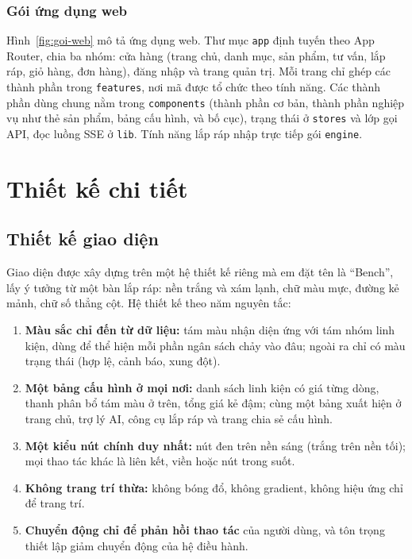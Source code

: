 \subsubsection{Gói ứng dụng web}


Hình~\ref{fig:goi-web} mô tả ứng dụng web. Thư mục \texttt{app} định tuyến theo App Router, chia ba nhóm: cửa hàng (trang chủ, danh mục, sản phẩm, tư vấn, lắp ráp, giỏ hàng, đơn hàng), đăng nhập và trang quản trị. Mỗi trang chỉ ghép các thành phần trong \texttt{features}, nơi mã được tổ chức theo tính năng. Các thành phần dùng chung nằm trong \texttt{components} (thành phần cơ bản, thành phần nghiệp vụ như thẻ sản phẩm, bảng cấu hình, và bố cục), trạng thái ở \texttt{stores} và lớp gọi API, đọc luồng SSE ở \texttt{lib}. Tính năng lắp ráp nhập trực tiếp gói \texttt{engine}.

\section{Thiết kế chi tiết}

\subsection{Thiết kế giao diện}

Giao diện được xây dựng trên một hệ thiết kế riêng mà em đặt tên là ``Bench'', lấy ý tưởng từ một bàn lắp ráp: nền trắng và xám lạnh, chữ màu mực, đường kẻ mảnh, chữ số thẳng cột. Hệ thiết kế theo năm nguyên tắc:
\begin{enumerate}[label=(\roman*)]
  \item \textbf{Màu sắc chỉ đến từ dữ liệu:} tám màu nhận diện ứng với tám nhóm linh kiện, dùng để thể hiện mỗi phần ngân sách chảy vào đâu; ngoài ra chỉ có màu trạng thái (hợp lệ, cảnh báo, xung đột).
  \item \textbf{Một bảng cấu hình ở mọi nơi:} danh sách linh kiện có giá từng dòng, thanh phân bổ tám màu ở trên, tổng giá kẻ đậm; cùng một bảng xuất hiện ở trang chủ, trợ lý AI, công cụ lắp ráp và trang chia sẻ cấu hình.
  \item \textbf{Một kiểu nút chính duy nhất:} nút đen trên nền sáng (trắng trên nền tối); mọi thao tác khác là liên kết, viền hoặc nút trong suốt.
  \item \textbf{Không trang trí thừa:} không bóng đổ, không gradient, không hiệu ứng chỉ để trang trí.
  \item \textbf{Chuyển động chỉ để phản hồi thao tác} của người dùng, và tôn trọng thiết lập giảm chuyển động của hệ điều hành.
\end{enumerate}

